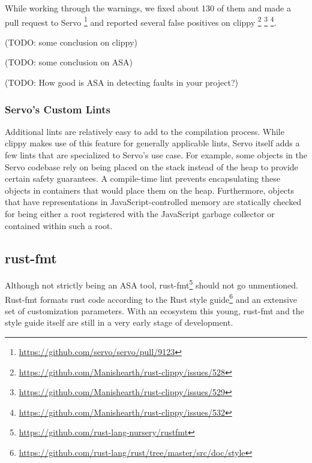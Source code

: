 \documentclass{scrartcl}
\newcommand{\todo}[1] {{\color{red}(TODO: #1)}}
\begin{document}
While working through the warnings, we fixed about 130 of them and made a pull request to Servo \footnote{\url{https://github.com/servo/servo/pull/9123}} and reported several false positives on clippy \footnote{\url{https://github.com/Manishearth/rust-clippy/issues/528}} \footnote{\url{https://github.com/Manishearth/rust-clippy/issues/529}} \footnote{\url{https://github.com/Manishearth/rust-clippy/issues/532}}.


\todo{some conclusion on clippy}

\todo{some conclusion on ASA}

\todo{How good is ASA in detecting faults in your project?}


\subsubsection{Servo's Custom Lints}

Additional lints are relatively easy to add to the compilation process. While clippy makes use of this feature for generally applicable lints, Servo itself adds a few lints that are specialized to Servo's use case. For example, some objects in the Servo codebase rely on being placed on the stack instead of the heap to provide certain safety guarantees. A compile-time lint prevents encapsulating these objects in containers that would place them on the heap. Furthermore, objects that have representations in JavaScript-controlled memory are statically checked for being either a root registered with the JavaScript garbage collector or contained within such a root.


\subsection{rust-fmt}

Although not strictly being an ASA tool, rust-fmt\footnote{\url{https://github.com/rust-lang-nursery/rustfmt}} should not go unmentioned. Rust-fmt formats rust code according to the Rust style guide\footnote{\url{https://github.com/rust-lang/rust/tree/master/src/doc/style}} and an extensive set of customization parameters. With an ecosystem this young, rust-fmt and the style guide itself are still in a very early stage of development.
\end{document}

